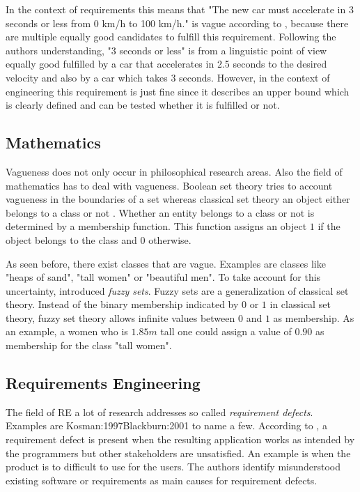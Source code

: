 In the context of requirements this means that "The new car must accelerate in 3 seconds or less from 0 km/h to 100 km/h." is vague according to \textcite{Braun:2007}, because there are multiple equally good candidates to fulfill this requirement.
Following the authors understanding, "3 seconds or less" is from a linguistic point of view equally good fulfilled by a car that accelerates in 2.5 seconds to the desired velocity and also by a car which takes 3 seconds.
However, in the context of engineering this requirement is just fine since it describes an upper bound which is clearly defined and can be tested whether it is fulfilled or not.

\subsection{Mathematics}
\label{chp:fundamentals:sec:vagueness:subsec:mathematics}
Vagueness does not only occur in philosophical research areas.
Also the field of mathematics has to deal with vagueness.
Boolean set theory tries to account vagueness in the boundaries of a set whereas classical set theory an object either belongs to a class or not \parencite{Fisher:2000}.
Whether an entity belongs to a class or not is determined by a membership function.
This function assigns an object $1$ if the object belongs to the class and $0$ otherwise.

As seen before, there exist classes that are vague.
Examples are classes like "heaps of sand", "tall women" or "beautiful men".
To take account for this uncertainty, \textcite{Zadeh:1965} introduced \textit{fuzzy sets}.
Fuzzy sets are a generalization of classical set theory.
Instead of the binary membership indicated by $0$ or $1$ in classical set theory, fuzzy set theory allows infinite values between $0$ and $1$ as membership.
As an example, a women who is $1.85m$ tall one could assign a value of $0.90$ as membership for the class "tall women".

\subsection{Requirements Engineering}
\label{chp:fundamentals:sec:vagueness:subsec:requirement_engineering}
The field of \ac{RE} a lot of research addresses so called \textit{requirement defects}.
Examples are \textcite{Lauesen:2001}{Kosman:1997}{Blackburn:2001} to name a few.
According to \textcite{Lauesen:2001}, a requirement defect is present when the resulting application works as intended by the programmers but other stakeholders are unsatisfied.
An example is when the product is to difficult to use for the users.
The authors identify misunderstood existing software or requirements as main causes for requirement defects.

